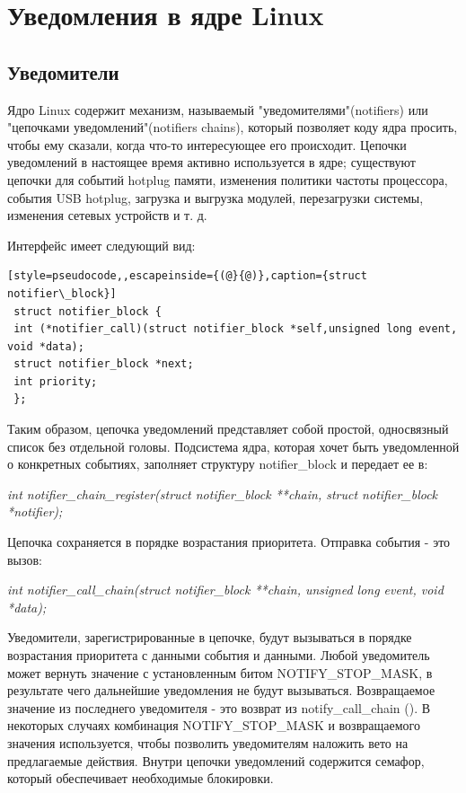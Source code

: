 \section{Уведомления в ядре Linux}

\subsection{Уведомители}
Ядро Linux содержит механизм, называемый "уведомителями"(notifiers) или "цепочками уведомлений"(notifiers chains), который позволяет коду ядра просить, чтобы ему сказали, когда что-то интересующее его происходит. Цепочки уведомлений в настоящее время активно используется в ядре; существуют цепочки для событий hotplug памяти, изменения политики частоты процессора, события USB hotplug, загрузка и выгрузка модулей, перезагрузки системы, изменения сетевых устройств и т. д. \cite{book1}

Интерфейс имеет следующий вид:
 \begin{lstlisting}[style=pseudocode,,escapeinside={(@}{@)},caption={struct notifier\_block}] 
 struct notifier_block {
 int (*notifier_call)(struct notifier_block *self,unsigned long event, void *data);	
 struct notifier_block *next;
 int priority;
 };
 \end{lstlisting}
 Таким образом, цепочка уведомлений представляет собой простой, односвязный список без отдельной головы. Подсистема ядра, которая хочет быть уведомленной о конкретных событиях, заполняет структуру notifier\_block и передает ее в:
 
\textit{ int notifier\_chain\_register(struct notifier\_block **chain, 
 struct notifier\_block *notifier);}

Цепочка сохраняется в порядке возрастания приоритета. Отправка события - это вызов:

   \textit{ int notifier\_call\_chain(struct notifier\_block **chain, 
    unsigned long event, void *data);}

Уведомители, зарегистрированные в цепочке, будут вызываться в порядке возрастания приоритета с данными события и данными. Любой уведомитель может вернуть значение с установленным битом NOTIFY\_STOP\_MASK, в результате чего дальнейшие уведомления не будут вызываться. Возвращаемое значение из последнего уведомителя - это возврат из notify\_call\_chain (). В некоторых случаях комбинация NOTIFY\_STOP\_MASK и возвращаемого значения используется, чтобы позволить уведомителям наложить вето на предлагаемые действия. Внутри цепочки уведомлений содержится семафор, который обеспечивает необходимые блокировки.

